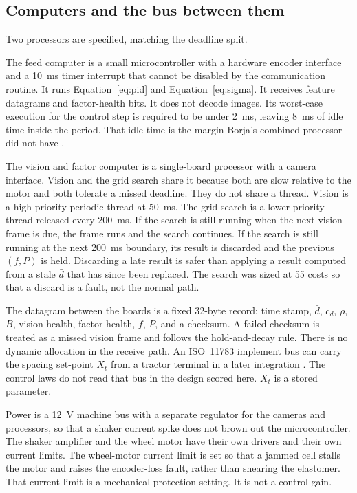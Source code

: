 \subsection{Computers and the bus between them}

Two processors are specified, matching the deadline split.

The feed computer is a small microcontroller with a hardware encoder interface and a 10~ms timer interrupt that cannot be disabled by the communication routine. It runs Equation~\eqref{eq:pid} and Equation~\eqref{eq:sigma}. It receives feature datagrams and factor-health bits. It does not decode images. Its worst-case execution for the control step is required to be under 2~ms, leaving 8~ms of idle time inside the period. That idle time is the margin Borja's combined processor did not have \cite{borja2021}.

The vision and factor computer is a single-board processor with a camera interface. Vision and the grid search share it because both are slow relative to the motor and both tolerate a missed deadline. They do not share a thread. Vision is a high-priority periodic thread at 50~ms. The grid search is a lower-priority thread released every 200~ms. If the search is still running when the next vision frame is due, the frame runs and the search continues. If the search is still running at the next 200~ms boundary, its result is discarded and the previous $(f,P)$ is held. Discarding a late result is safer than applying a result computed from a stale $\bar d$ that has since been replaced. The search was sized at 55 costs so that a discard is a fault, not the normal path.

The datagram between the boards is a fixed 32-byte record: time stamp, $\bar d$, $c_d$, $\rho$, $B$, vision-health, factor-health, $f$, $P$, and a checksum. A failed checksum is treated as a missed vision frame and follows the hold-and-decay rule. There is no dynamic allocation in the receive path. An ISO~11783 implement bus can carry the spacing set-point $X_t$ from a tractor terminal in a later integration \cite{iso11783}. The control laws do not read that bus in the design scored here. $X_t$ is a stored parameter.

Power is a 12~V machine bus with a separate regulator for the cameras and processors, so that a shaker current spike does not brown out the microcontroller. The shaker amplifier and the wheel motor have their own drivers and their own current limits. The wheel-motor current limit is set so that a jammed cell stalls the motor and raises the encoder-loss fault, rather than shearing the elastomer. That current limit is a mechanical-protection setting. It is not a control gain.

